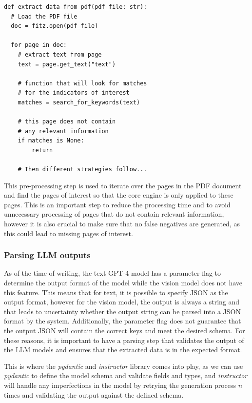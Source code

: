 \documentclass[english, 12pt, a4paper, elec, utf8, a-2b, online]{aaltothesis}
\begin{document}
\begin{verbatim}
def extract_data_from_pdf(pdf_file: str):
  # Load the PDF file
  doc = fitz.open(pdf_file)

  for page in doc:
    # extract text from page
    text = page.get_text("text")

    # function that will look for matches
    # for the indicators of interest
    matches = search_for_keywords(text)

    # this page does not contain
    # any relevant information
    if matches is None:
        return

    # Then different strategies follow...
\end{verbatim}

This pre-processing step is used to iterate over the pages in the \ac{PDF} document and find the pages of interest so that the core engine is only applied to these pages.
This is an important step to reduce the processing time and to avoid unnecessary processing of pages that do not contain relevant information, however it is also crucial to make sure that no false negatives are generated, as this could lead to missing pages of interest.

\subsubsection{Parsing \ac{LLM} outputs}

As of the time of writing, the text \ac{GPT}-4 model has a parameter flag to determine the output format of the model while the vision model does not have this feature.
This means that for text, it is possible to specify \ac{JSON} as the output format, however for the vision model, the output is always a string and that leads to uncertainty whether the output string can be parsed into a \ac{JSON} format by the system.
Additionally, the parameter flag does not guarantee that the output \ac{JSON} will contain the correct keys and meet the desired schema.
For these reasons, it is important to have a parsing step that validates the output of the \ac{LLM} models and ensures that the extracted data is in the expected format.

This is where the \textit{pydantic} and \textit{instructor} library comes into play, as we can use \textit{pydantic} to define the model schema and validate fields and types, and \textit{instructor} will handle any imperfections in the model by retrying the generation process $n$ times and validating the output against the defined schema.
\end{document}
